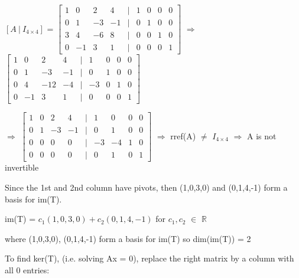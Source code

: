     \begin{tbox}
        $[A \ | \ I_{4 \times 4}]$ =
        \scriptsize
        $\begin{bmatrix}
            1 & 0 & 2 & 4 & | & 1 & 0 & 0 & 0 \\
            0 & 1 & -3 & -1 & | & 0 & 1 & 0 & 0 \\
            3 & 4 & -6 & 8 & | & 0 & 0 & 1 & 0 \\
            0 & -1 & 3 & 1 & | & 0 & 0 & 0 & 1
        \end{bmatrix}$
        $\Rightarrow$
        $\begin{bmatrix}
            1 & 0 & 2 & 4 & | & 1 & 0 & 0 & 0 \\
            0 & 1 & -3 & -1 & | & 0 & 1 & 0 & 0 \\
            0 & 4 & -12 & -4 & | & -3 & 0 & 1 & 0 \\
            0 & -1 & 3 & 1 & | & 0 & 0 & 0 & 1
        \end{bmatrix}$

        \hspace{1.8cm}
        $\Rightarrow$
        $\begin{bmatrix}
            1 & 0 & 2 & 4 & | & 1 & 0 & 0 & 0 \\
            0 & 1 & -3 & -1 & | & 0 & 1 & 0 & 0 \\
            0 & 0 & 0 & 0 & | & -3 & -4 & 1 & 0 \\
            0 & 0 & 0 & 0 & | & 0 & 1 & 0 & 1
        \end{bmatrix}$
        \normalsize
        $\Rightarrow$
        rref(A) $\not =$ $I_{4 \times 4}$
        $\Rightarrow$
        A is not invertible

        \vspace{0.3cm}

        Since the 1st and 2nd column have pivots,
        then (1,0,3,0) and (0,1,4,-1) form a basis for im(T).

        \hspace{0.5cm}
        im(T) = $c_1(1,0,3,0) + c_2(0,1,4,-1)$
        \hspace{0.5cm}
        for $c_1,c_2$ $\in$ $\mathbb{R}$

        \hspace{0.5cm}
        where (1,0,3,0), (0,1,4,-1) form a basis for im(T) so dim(im(T)) = 2

        \vspace{0.3cm}

        To find ker(T), (i.e. solving Ax = 0),
        replace the right matrix by a column with all 0 entries:


\end{tbox}
